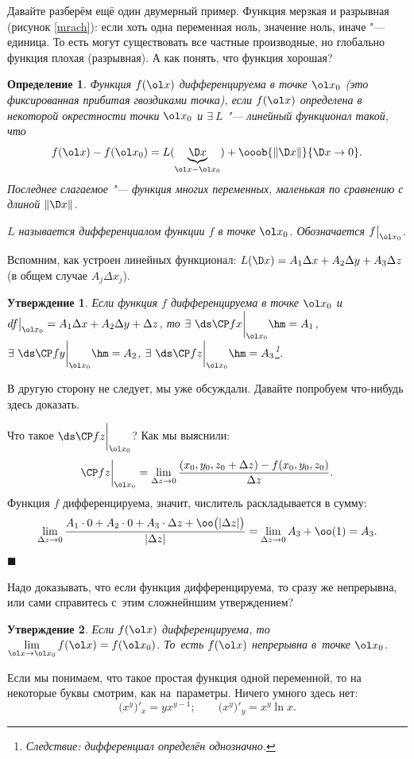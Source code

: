 \documentclass[a4paper,10pt,twoside]{article}
\newtheorem{Def}{Определение}[section]
\newtheorem{Ut}{Утверждение}[section]
\newenvironment{Proof}
       {\par\noindent{\textbf{Доказательство.}}}
       {\hfill$\scriptstyle\blacksquare$}
\begin{document}
	 Давайте разберём ещё один двумерный пример. Функция мерзкая и разрывная (рисунок \ref{mrach}): если хоть одна переменная ноль, значение ноль, иначе "--- единица.
	 То есть могут существовать все частные производные, но глобально функция плохая (разрывная). А как понять, что функция хорошая?
	 \begin{Def}\label{diffM}
	 Функция $f(\ol x)$ дифференцируема в точке $\ol x_0$ (это фиксированная прибитая гвоздиками точка), если
	 $f(\ol x)$ определена в некоторой окрестности точки $\ol x_0$ и $\exists\ L$ "--- линейный функционал такой, что
	 \[f(\ol x) - f(\ol x_0) = L(\underbrace{\D x}_{\ol x- \ol x_0}) + \ooob{\|\D x\|}{\D x\to 0}.\]
	 Последнее слагаемое "--- функция многих переменных, маленькая по сравнению с длиной $\|\D x\|$.
	 
	 $L$ называется дифференциалом функции $f$ в точке $\ol x_0$. Обозначается $f\big|_{\ol x_0}$.
	 \end{Def}
	 Вспомним, как устроен линейных функционал: $L(\D x) = A_1\Delta x + A_2\Delta y + A_3\Delta z$ (в общем случае $A_j\Delta x_j$).
	 \begin{Ut}
	 Если функция $f$ дифференцируема в точке $\ol x_0$ и $d f\big|_{\ol x_0} = A_1\Delta x + A_2 \Delta y + \Delta z$, то
	 $\exists\ \ds\CP fx\bigg|_{\ol x_0} \hm= A_1$, $\exists\ \ds\CP fy\bigg|_{\ol x_0} \hm= A_2$, $\exists\ \ds\CP fz\bigg|_{\ol x_0} \hm= A_3$\footnote{Следствие: дифференциал определён однозначно.}.
	 \end{Ut}
	 В другую сторону не следует, мы уже обсуждали. Давайте попробуем что-нибудь здесь доказать.
	 \begin{Proof}
	 Что такое $\ds\CP fz\bigg|_{\ol x_0}$? Как мы выяснили:
	 \[\CP fz\bigg|_{\ol x_0} = \lim\limits_{\Delta z\to 0}\frac{(x_0,y_0,z_0+\Delta z) - f(x_0,y_0,z_0)}{\Delta z}.\]
	 Функция $f$ дифференцируема, значит, числитель раскладывается в сумму:
	 \[\lim\limits_{\Delta z\to 0}\frac{A_1\cdot 0 +A_2\cdot 0 + A_3\cdot \Delta z + \oo\big(|\Delta z|\big)}{|\Delta z|} = \lim\limits_{\Delta z\to 0}A_3 + \oo(1) = A_3.\] 
	 \end{Proof}
	 
	 Надо доказывать, что если функция дифференцируема, то сразу же непрерывна, или сами справитесь с~этим сложнейншим утверждением?
	 \begin{Ut}
	 Если $f(\ol x) $ дифференцируема, то $\lim\limits_{\ol x\to \ol x_0}f(\ol x) = f(\ol x_0)$. То~есть $f(\ol x)$ непрерывна в~точке $\ol x_0$.
	 \end{Ut}
	 Если мы понимаем, что такое простая функция одной переменной, то на некоторые буквы смотрим, как на~параметры. Ничего умного здесь нет:
	 \[\big(x^y\big)'_x=yx^{y-1};\qquad\big(x^y\big)'_y = x^y\ln x.\]
\end{document}
